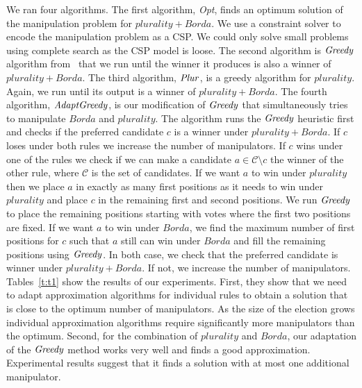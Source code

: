 \documentclass{ecai2012}
\newcommand{\winner}[2]{\mbox{$#1 + #2$}}
\newcommand{\plurshort}{\mbox{\emph{Plur}}\xspace}
\newcommand{\bordashort}{\mbox{\emph{Greedy}}\xspace}
\newcommand{\bordaplurshort}{\mbox{\emph{AdaptGreedy}}\xspace}
\begin{document}
We ran four algorithms. The first algorithm,\emph{ Opt},
finds an optimum solution of the manipulation problem for
$\winner{plurality}{Borda}$.
We use a constraint solver to encode the
manipulation problem as a CSP. We could only solve small
problems using complete search as the CSP model is
loose. %
The second algorithm is $\bordashort$ algorithm from~\cite{zuckermanSODA08}
that we run until the winner
it produces is also a winner of $\winner{plurality}{Borda}$. The third
algorithm, $\plurshort$, is a greedy algorithm for $plurality$.
Again, we run until its output is a winner
of $\winner{plurality}{Borda}$. The fourth algorithm, $\bordaplurshort$,
 is our modification
of $\bordashort$ that simultaneously tries to manipulate
$Borda$ and $plurality$. The algorithm runs the $\bordashort$
heuristic first and checks if the preferred candidate $c$ is
a winner under $\winner{plurality}{Borda}$. If $c$ loses under both
rules we increase the number of manipulators. If $c$
wins under one of the rules we check if we can make
a candidate $a \in \mathcal{C} \setminus c$ the winner
of the other rule, where $\mathcal{C}$ is the set of candidates.
If we want $a$ to win under $plurality$
then we place $a$ in exactly as many first positions
as it needs to win under $plurality$ and place $c$ in the remaining
first and second positions. We run $\bordashort$
to place the remaining  positions starting with
votes where the first two positions are fixed.
If we want $a$ to win  under $Borda$, we
find the maximum number of first
positions for $c$ such that $a$ still can win
under $Borda$ and fill the remaining positions
using $\bordashort$. In both case, we check that
the preferred candidate is winner under
$\winner{plurality}{Borda}$.  If not, we increase the number
of manipulators. Tables~\ref{t:t1}
show the results of our experiments.
First, they show that we need to adapt
approximation algorithms
for individual rules to obtain a
solution that is close to the optimum number
of manipulators. As the size
of the election grows individual
approximation algorithms require
significantly more manipulators
than the optimum.
Second, for the combination of $plurality$
and $Borda$, our adaptation
of the $\bordashort$ method works very well
and finds a good approximation.
Experimental results suggest
that %
it finds a solution with at most one additional
manipulator.
\end{document}
